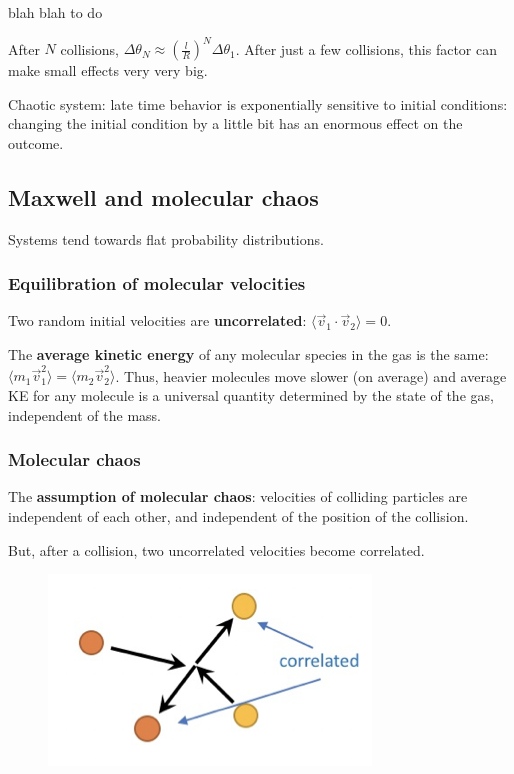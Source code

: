 blah blah to do

After $N$ collisions, $\Delta \theta_N \approx (\frac{l}{R})^N \Delta \theta_1$. After just a few collisions, this factor can make small effects very very big.

Chaotic system: late time behavior is exponentially sensitive to initial conditions: changing the initial condition by a little bit has an enormous effect on the outcome.

\subsection{Maxwell and molecular chaos}

Systems tend towards flat probability distributions.

\subsubsection{Equilibration of molecular velocities}

Two random initial velocities are \textbf{uncorrelated}: $\langle \vec{v}_1 \cdot \vec{v}_2 \rangle = 0$.

The \textbf{average kinetic energy} of any molecular species in the gas is the same: $\langle m_1 \vec{v}_1^2 \rangle = \langle m_2 \vec{v}_2^2 \rangle$. Thus, heavier molecules move slower (on average) and average KE for any molecule is a universal quantity determined by the state of the gas, independent of the mass.

\subsubsection{Molecular chaos}

The \textbf{assumption of molecular chaos}: velocities of colliding particles are independent of each other, and independent of the position of the collision.

But, after a collision, two uncorrelated velocities become correlated.

\begin{figure}[h]
    \centering
    \includegraphics[width=0.4\linewidth]{figures/03_03.png}
\end{figure}

